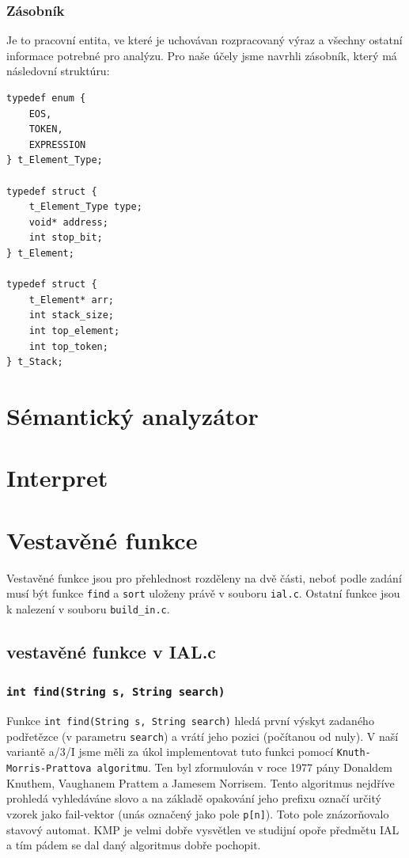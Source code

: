 \documentclass[a4paper,11pt]{article}
\begin{document}
\subsubsection{Zásobník}
Je to pracovní entita, ve které je uchovávan rozpracovaný výraz a všechny ostatní informace potrebné pro analýzu. Pro naše účely jsme navrhli zásobník, který má následovní struktúru:

\begin{lstlisting}[caption={Výstupní struktura SA}, label={lst:saOut}]
typedef enum {
    EOS,
    TOKEN,
    EXPRESSION
} t_Element_Type;

typedef struct {
    t_Element_Type type;
    void* address;
    int stop_bit;
} t_Element;

typedef struct {
    t_Element* arr;
    int stack_size;
    int top_element;
    int top_token;
} t_Stack;

\end{lstlisting}


\section{Sémantický analyzátor}


\section{Interpret}

\section{Vestavěné funkce}
Vestavěné funkce jsou pro přehlednost rozděleny na dvě části, neboť podle zadání musí být funkce \texttt{find} a \texttt{sort} uloženy právě v souboru \texttt{ial.c}. Ostatní funkce jsou k nalezení v souboru \texttt{build\_in.c}.

\subsection {vestavěné funkce v IAL.c}

\subsubsection {\texttt{int find(String s, String search)}}
Funkce \texttt{int find(String s, String search)} hledá první výskyt zadaného podřetězce (v parametru \texttt{search}) a vrátí jeho pozici (počítanou od nuly). V naší variantě a/3/I jsme měli za úkol implementovat tuto funkci pomocí \texttt{Knuth-Morris-Prattova algoritmu}. Ten byl zformulován v roce 1977 pány Donaldem Knuthem, Vaughanem Prattem a Jamesem Norrisem. Tento algoritmus nejdříve prohledá vyhledáváne slovo a na základě opakování jeho prefixu označí určitý vzorek jako fail-vektor (unás označený jako pole \texttt{p[n]}). Toto pole znázorňovalo stavový automat. KMP je velmi dobře vysvětlen ve studijní opoře předmětu IAL a tím pádem se dal daný algoritmus dobře pochopit.
\end{document}

